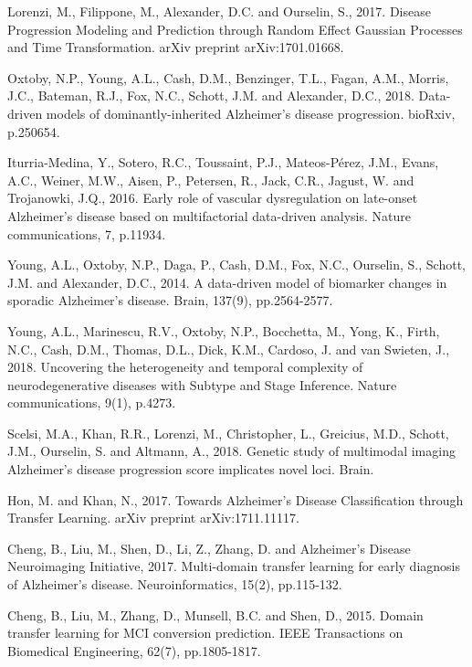 \documentclass{llncs}
\begin{document}

\begin{thebibliography}{5}

Lorenzi, M., Filippone, M., Alexander, D.C. and Ourselin, S., 2017. Disease Progression Modeling and Prediction through Random Effect Gaussian Processes and Time Transformation. arXiv preprint arXiv:1701.01668.


Oxtoby, N.P., Young, A.L., Cash, D.M., Benzinger, T.L., Fagan, A.M., Morris, J.C., Bateman, R.J., Fox, N.C., Schott, J.M. and Alexander, D.C., 2018. Data-driven models of dominantly-inherited Alzheimer's disease progression. bioRxiv, p.250654.


Iturria-Medina, Y., Sotero, R.C., Toussaint, P.J., Mateos-Pérez, J.M., Evans, A.C., Weiner, M.W., Aisen, P., Petersen, R., Jack, C.R., Jagust, W. and Trojanowki, J.Q., 2016. Early role of vascular dysregulation on late-onset Alzheimer's disease based on multifactorial data-driven analysis. Nature communications, 7, p.11934.


Young, A.L., Oxtoby, N.P., Daga, P., Cash, D.M., Fox, N.C., Ourselin, S., Schott, J.M. and Alexander, D.C., 2014. A data-driven model of biomarker changes in sporadic Alzheimer's disease. Brain, 137(9), pp.2564-2577.


Young, A.L., Marinescu, R.V., Oxtoby, N.P., Bocchetta, M., Yong, K., Firth, N.C., Cash, D.M., Thomas, D.L., Dick, K.M., Cardoso, J. and van Swieten, J., 2018. Uncovering the heterogeneity and temporal complexity of neurodegenerative diseases with Subtype and Stage Inference. Nature communications, 9(1), p.4273.

Scelsi, M.A., Khan, R.R., Lorenzi, M., Christopher, L., Greicius, M.D., Schott, J.M., Ourselin, S. and Altmann, A., 2018. Genetic study of multimodal imaging Alzheimer's disease progression score implicates novel loci. Brain.


Hon, M. and Khan, N., 2017. Towards Alzheimer's Disease Classification through Transfer Learning. arXiv preprint arXiv:1711.11117.


Cheng, B., Liu, M., Shen, D., Li, Z., Zhang, D. and Alzheimer's Disease Neuroimaging Initiative, 2017. Multi-domain transfer learning for early diagnosis of Alzheimer's disease. Neuroinformatics, 15(2), pp.115-132.

Cheng, B., Liu, M., Zhang, D., Munsell, B.C. and Shen, D., 2015. Domain transfer learning for MCI conversion prediction. IEEE Transactions on Biomedical Engineering, 62(7), pp.1805-1817.


\end{thebibliography}
\end{document}
